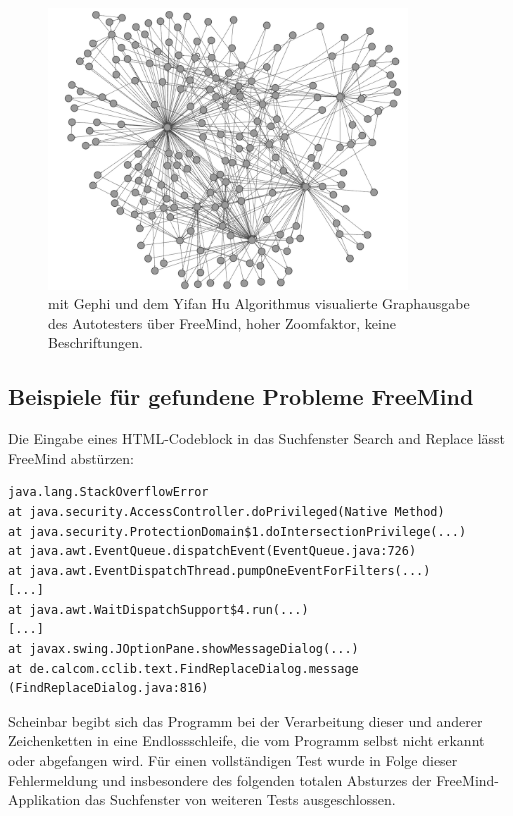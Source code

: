 \begin{figure}
	\centering
	\includegraphics[width=0.85\textwidth]{bilder/model_freemind_notext.png}
	\caption{mit Gephi und dem Yifan Hu Algorithmus\cite{hu2005efficient}
    visualierte Graphausgabe des Autotesters über FreeMind, hoher Zoomfaktor, keine Beschriftungen.}
	\label{fig:screenshot_freemind}
\end{figure}


\subsection{Beispiele für gefundene Probleme FreeMind}

Die Eingabe eines HTML-Codeblock in das Suchfenster \glqq{}Search and Replace\grqq{}
lässt FreeMind abstürzen:

\begin{lstlisting}[float=!ht,label=fmjson,caption={Ausnahme FreeMind durch HTML-Suchbegriff}]
java.lang.StackOverflowError
at java.security.AccessController.doPrivileged(Native Method)
at java.security.ProtectionDomain$1.doIntersectionPrivilege(...)
at java.awt.EventQueue.dispatchEvent(EventQueue.java:726)
at java.awt.EventDispatchThread.pumpOneEventForFilters(...)
[...]
at java.awt.WaitDispatchSupport$4.run(...)
[...]
at javax.swing.JOptionPane.showMessageDialog(...)
at de.calcom.cclib.text.FindReplaceDialog.message
(FindReplaceDialog.java:816)
\end{lstlisting}

Scheinbar begibt sich das Programm bei der Verarbeitung dieser und anderer
Zeichenketten in eine Endlossschleife, die vom Programm selbst
nicht erkannt oder abgefangen wird. Für einen
vollständigen Test wurde in Folge dieser Fehlermeldung
und insbesondere des folgenden totalen Absturzes der FreeMind-Applikation
das Suchfenster von weiteren Tests ausgeschlossen.

